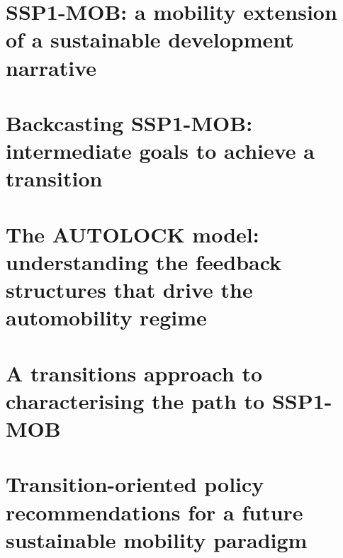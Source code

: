 \section[The SSP1-MOB sustainable mobility narrative]{SSP1-MOB: a mobility extension of a sustainable development narrative}
\label{s:results:ssp1-mob}


\section[Backcasting SSP1-MOB]{Backcasting SSP1-MOB: intermediate goals to achieve a transition}
\label{s:results:backcasting-ssp1-mob}


\section[The (auto)mobility AUTOLOCK model]{The AUTOLOCK model: understanding the feedback structures that drive the automobility regime}
\label{s:results:autolock-model}


\section[Characterising the transition to SSP1-MOB]{A transitions approach to characterising the path to SSP1-MOB}
\label{s:results:characterizing-transition}


\section[Transition-oriented policy recommendations]{Transition-oriented policy recommendations for a future sustainable mobility paradigm}
\label{s:results:policy-recommendations}

